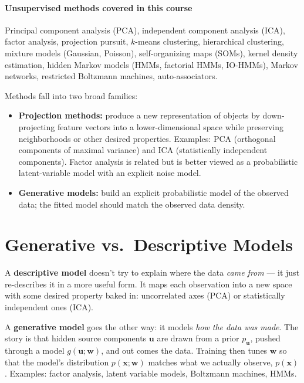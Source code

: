\documentclass[11pt, oneside]{book}
\newcommand{\wvec}{\bm{w}}
\newcommand{\xvec}{\bm{x}}
\newcommand{\uvec}{\bm{u}}
\begin{document}
\paragraph{Unsupervised methods covered in this course}
Principal component analysis (PCA), independent component analysis (ICA), factor analysis,
projection pursuit, $k$-means clustering, hierarchical clustering, mixture models
(Gaussian, Poisson), self-organizing maps (SOMs), kernel density estimation, hidden Markov
models (HMMs, factorial HMMs, IO-HMMs), Markov networks, restricted Boltzmann machines,
auto-associators.

Methods fall into two broad families:
\begin{itemize}
  \item \textbf{Projection methods:} produce a new representation of objects by
        down-projecting feature vectors into a lower-dimensional space while preserving
        neighborhoods or other desired properties.
        Examples: PCA (orthogonal components of maximal variance) and ICA (statistically
        independent components). Factor analysis is related but is better viewed as a
        probabilistic latent-variable model with an explicit noise model.
  \item \textbf{Generative models:} build an explicit probabilistic model of the observed
        data; the fitted model should match the observed data density.
\end{itemize}


\section{Generative vs.\ Descriptive Models}
\label{sec:gen-vs-desc}

\begin{defbox}[title={Descriptive (Recoding) Model}]
A \textbf{descriptive model} doesn't try to explain where the data \emph{came from} ---
it just re-describes it in a more useful form. It maps each observation into a new space
with some desired property baked in: uncorrelated axes (PCA) or statistically independent
ones (ICA).
\end{defbox}

\begin{defbox}[title={Generative Model}]
A \textbf{generative model} goes the other way: it models \emph{how the data was made}.
The story is that hidden source components $\uvec$ are drawn from a prior $p_{\uvec}$,
pushed through a model $g(\uvec;\wvec)$, and out comes the data. Training then tunes
$\wvec$ so that the model's distribution $p(\xvec;\wvec)$ matches what we actually
observe, $p(\xvec)$.
Examples: factor analysis, latent variable models, Boltzmann machines, HMMs.
\end{defbox}
\end{document}
